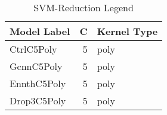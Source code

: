 \begin{table}[!htbp]
\centering
\caption{SVM-Reduction Legend}
\label{tab:SVM-Reduction_legend}
\begin{tabular}{lrl}
\toprule
Model Label & C & Kernel Type \\
\midrule
CtrlC5Poly & 5 & poly \\
GcnnC5Poly & 5 & poly \\
EnnthC5Poly & 5 & poly \\
Drop3C5Poly & 5 & poly \\
\bottomrule
\end{tabular}
\end{table}
